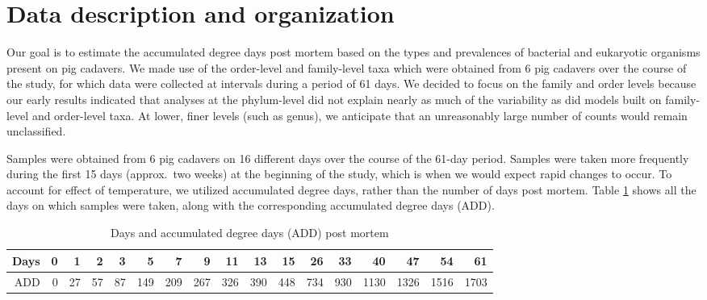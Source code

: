 \documentclass{article}
\begin{document}
\section{Data description and organization}

Our goal is to estimate the accumulated degree days post mortem based
on the types and prevalences of bacterial and eukaryotic organisms
present on pig cadavers.  We made use of the order-level and
family-level taxa which were obtained from 6 pig cadavers over the
course of the study, for which data were collected at intervals during
a period of 61 days.  We decided to focus on the family and order
levels because our early results indicated that analyses at the
phylum-level did not explain nearly as much of the variability as did
models built on family-level and order-level taxa.  At lower, finer
levels (such as genus), we anticipate that an unreasonably large
number of counts would remain unclassified.

Samples were obtained from 6 pig cadavers on 16 different days over
the course of the 61-day period.  Samples were taken more frequently
during the first 15 days (approx.~two weeks) at the beginning of the
study, which is when we would expect rapid changes to occur.  To
account for effect of temperature, we utilized accumulated degree
days, rather than the number of days post mortem.  Table
\ref{tbl:degdays_vs_days} shows all the days on which samples were
taken, along with the corresponding accumulated degree days (ADD).
\begin{table}[hb]
  \centering
  \caption{\label{tbl:degdays_vs_days}Days and accumulated degree days
    (ADD) post mortem}
  \begin{tabular}{r|rrrrrrrrrrrrrrrr}
  Days & 0 & 1 & 2 & 3 & 5 & 7 & 9 & 11 & 13 & 15 & 26 & 33 & 40 & 47 & 54 & 61\\ \hline
  ADD & 0 & 27 & 57 & 87 & 149 & 209 & 267 & 326 & 390 & 448 & 734 & 930 & 1130 & 1326 & 1516 & 1703
  \end{tabular}
\end{table}
\end{document}
